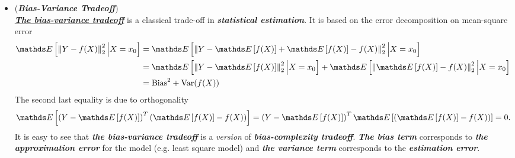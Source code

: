 \documentclass[11pt]{article}
\begin{document}
\begin{itemize}
\item \begin{remark} (\textbf{\emph{Bias-Variance Tradeoff}}) \citep{hastie2009elements} \\
\underline{\emph{\textbf{The bias-variance tradeoff}}} is a classical trade-off in \emph{\textbf{statistical estimation}}. It is based on the error decomposition on mean-square error
\begin{align*}
\E{}{\norm{Y- f(X)}{2}^2 \Big| X = x_0} &= \E{}{\norm{Y - \E{}{f(X)} + \E{}{f(X)} - f(X)}{2}^2  \Big| X = x_0} \\
&= \E{}{\norm{Y - \E{}{f(X)}}{2}^2  \Big| X = x_0} + \E{}{\norm{\E{}{f(X)} - f(X)}{2}^2  \Big| X = x_0}\\
&= \text{Bias}^2 + \text{Var}(f(X))
\end{align*} The second last equality is due to orthogonality 
\begin{align*}
\E{}{\paren{Y - \E{}{f(X)}}^T\paren{\E{}{f(X)} - f(X)}} &= \paren{Y - \E{}{f(X)}}^T\E{}{\paren{\E{}{f(X)} - f(X)}} = 0.
\end{align*} It is easy to see that \emph{\textbf{the bias-variance tradeoff}} is a \emph{version} of \emph{\textbf{bias-complexity tradeoff}}. \emph{\textbf{The bias term}} corresponds to \emph{\textbf{the approximation error}} for the model (e.g. least square model) and \emph{\textbf{the variance term}} corresponds to the \emph{\textbf{estimation error}}.
\end{remark}
\end{itemize}
\end{document}
